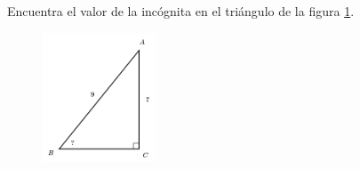 \question[15]  Encuentra el valor de la incógnita en el triángulo de la figura \ref{fig:angle_functrig_06}.
\begin{figure}[H]
    \begin{center}
        \includegraphics[width=0.3\textwidth]{../images/angle_functrig_06.png}
    \end{center}
    \caption{}
    \label{fig:angle_functrig_06}
\end{figure}